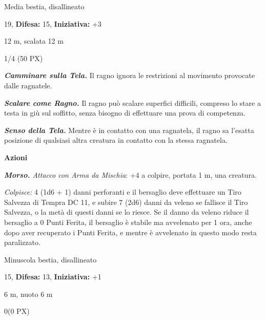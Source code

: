 \begin{multicols}{2}
{
\begin{description}[noitemsep, topsep=0pt, parsep=0pt, partopsep=0pt, leftmargin=0cm, labelwidth=2.2cm]
    \item[\textbf{Taglia/Tipo:}] Media bestia, disallineato
    \item[\textbf{Caratt.:}] 
    \item[\textbf{Punti Ferita:}] 19,  \textbf{Difesa:} 15,  \textbf{Iniziativa:} +3
    \item[\textbf{Tiri Salvez.:}] 
    \item[\textbf{Movimento:}] 12 m, scalata 12 m
    \item[\textbf{Sfida:}] 1/4 (50 PX)\smallskip
\end{description}

\emph{\textbf{Camminare sulla Tela.}} Il ragno ignora le restrizioni al movimento provocate dalle ragnatele.

\emph{\textbf{Scalare come Ragno.}} Il ragno può scalare superfici difficili, compreso lo stare a testa in giù sul soffitto, senza bisogno di effettuare una prova di competenza.

\emph{\textbf{Senso della Tela.}} Mentre è in contatto con una ragnatela, il ragno sa l'esatta posizione di qualsiasi altra creatura in contatto con la stessa ragnatela.

\textbf{Azioni}

\emph{\textbf{Morso.} Attacco con Arma da Mischia}: +4 a colpire, portata 1 m, una creatura.

\emph{Colpisce:} 4 (1d6 + 1) danni perforanti e il bersaglio deve effettuare un Tiro Salvezza di Tempra DC 11, e subire 7 (2d6) danni da veleno se fallisce il Tiro Salvezza, o la metà di questi danni se lo riesce. Se il danno da veleno riduce il bersaglio a 0 Punti Ferita, il bersaglio è stabile ma avvelenato per 1 ora, anche dopo aver recuperato i Punti Ferita, e mentre è avvelenato in questo modo resta paralizzato.

\begin{description}[noitemsep, topsep=0pt, parsep=0pt, partopsep=0pt, leftmargin=0cm, labelwidth=2.2cm]
    \item[\textbf{Taglia/Tipo:}] Minuscola bestia, disallineato
    \item[\textbf{Caratt.:}] 
    \item[\textbf{Punti Ferita:}] 15,  \textbf{Difesa:} 13,  \textbf{Iniziativa:} +1
    \item[\textbf{Tiri Salvez.:}] 
    \item[\textbf{Movimento:}] 6 m, nuoto 6 m
    \item[\textbf{Sfida:}] 0(0 PX)\smallskip
\end{description}

}
\end{multicols}
